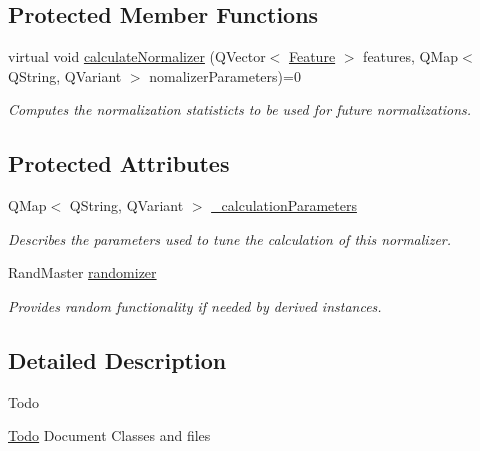 \subsection*{\-Protected \-Member \-Functions}
\begin{DoxyCompactItemize}
\item 
virtual void \hyperlink{classhsom_1_1_normalizer_addd6ca248cc630ffa677788872b0ee13}{calculate\-Normalizer} (\-Q\-Vector$<$ \hyperlink{classhsom_1_1_feature}{\-Feature} $>$ features, \-Q\-Map$<$ \-Q\-String, \-Q\-Variant $>$ nomalizer\-Parameters)=0
\begin{DoxyCompactList}\small\item\em \-Computes the normalization statisticts to be used for future normalizations. \end{DoxyCompactList}\end{DoxyCompactItemize}
\subsection*{\-Protected \-Attributes}
\begin{DoxyCompactItemize}
\item 
\hypertarget{classhsom_1_1_normalizer_a0f156a4d8557dd56026ba1a82eefed23}{\-Q\-Map$<$ \-Q\-String, \-Q\-Variant $>$ \hyperlink{classhsom_1_1_normalizer_a0f156a4d8557dd56026ba1a82eefed23}{\-\_\-calculation\-Parameters}}\label{classhsom_1_1_normalizer_a0f156a4d8557dd56026ba1a82eefed23}

\begin{DoxyCompactList}\small\item\em \-Describes the parameters used to tune the calculation of this normalizer. \end{DoxyCompactList}\item 
\hypertarget{classhsom_1_1_normalizer_a3c888c25a91e9e01755c284b1100bdb3}{\-Rand\-Master \hyperlink{classhsom_1_1_normalizer_a3c888c25a91e9e01755c284b1100bdb3}{randomizer}}\label{classhsom_1_1_normalizer_a3c888c25a91e9e01755c284b1100bdb3}

\begin{DoxyCompactList}\small\item\em \-Provides random functionality if needed by derived instances. \end{DoxyCompactList}\end{DoxyCompactItemize}


\subsection{\-Detailed \-Description}
\begin{DoxyRefDesc}{\-Todo}
\item[\hyperlink{todo__todo000015}{\-Todo}]\-Document \-Classes and files \end{DoxyRefDesc}


